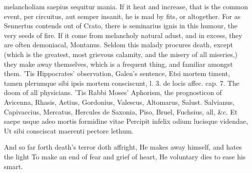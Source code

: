 melancholiam saepius sequitur mania. If it heat and increase,
that is the common event, per circuitus, aut semper insanit, he
is mad by fits, or altogether. For as Sennertus contends out of
Crato, there is seminarius ignis in this humour, the very seeds of
fire. If it come from melancholy natural adust, and in excess, they are
often demoniacal, Montanus.
Seldom this malady procures death, except (which is the greatest,
most grievous calamity, and the misery of all miseries,) they make away
themselves, which is a frequent thing, and familiar amongst them. 'Tis
Hippocrates' observation, Galen's sentence, Etsi mortem timent,
tamen plerumque sibi ipsis mortem consciscunt, l. 3. de locis affec.
cap. 7. The doom of all physicians. 'Tis Rabbi Moses' Aphorism,
the prognosticon of Avicenna, Rhasis, Aetius, Gordonius, Valescus,
Altomarus, Salust. Salvianus, Capivaccius, Mercatus, Hercules de
Saxonia, Piso, Bruel, Fuchsius, all, \&c.
Et saepe usque adeo mortis formidine vitae
Percipit infelix odium lucisque videndae,
Ut sibi consciscat maerenti pectore lethum.

And so far forth death's terror doth affright,
He makes away himself, and hates the light
To make an end of fear and grief of heart,
He voluntary dies to ease his smart.

